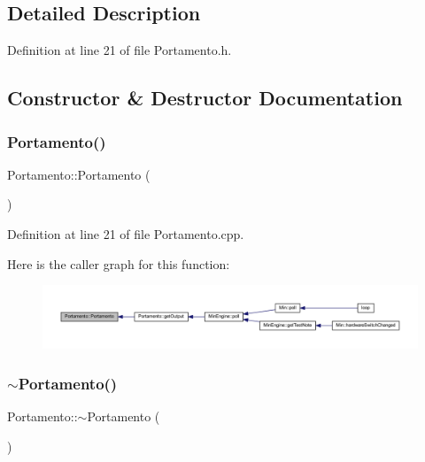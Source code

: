 \subsection{Detailed Description}


Definition at line 21 of file Portamento.\+h.



\subsection{Constructor \& Destructor Documentation}
\mbox{\label{class_portamento_a80ed457562045ae8d49da317e6a7ba0d}} 
\subsubsection{\texorpdfstring{Portamento()}{Portamento()}}
{\footnotesize\ttfamily Portamento\+::\+Portamento (\begin{DoxyParamCaption}{ }\end{DoxyParamCaption})}



Definition at line 21 of file Portamento.\+cpp.

Here is the caller graph for this function\+:
\nopagebreak
\begin{figure}[H]
\begin{center}
\leavevmode
\includegraphics[width=350pt]{d4/d10/class_portamento_a80ed457562045ae8d49da317e6a7ba0d_icgraph}
\end{center}
\end{figure}
\mbox{\label{class_portamento_a90f8e862c7a26ade2f7a955eea6da904}} 
\subsubsection{\texorpdfstring{$\sim$\+Portamento()}{~Portamento()}}
{\footnotesize\ttfamily Portamento\+::$\sim$\+Portamento (\begin{DoxyParamCaption}{ }\end{DoxyParamCaption})}



